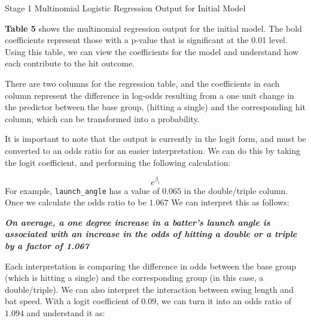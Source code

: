 \documentclass[
  letterpaper,
  DIV=11,
  numbers=noendperiod]{scrartcl}
\begin{document}
\begin{table}

\caption{\label{tbl-5}Stage 1 Multinomial Logistic Regression Output for
Initial Model}


\end{table}%

\textbf{Table 5} shows the multinomial regression output for the initial
model. The bold coefficients represent those with a p-value that is
significant at the 0.01 level. Using this table, we can view the
coefficients for the model and understand how each contribute to the hit
outcome.

There are two columns for the regression table, and the coefficients in
each column represent the difference in log-odds resulting from a one
unit change in the predictor between the base group, (hitting a single)
and the corresponding hit column, which can be transformed into a
probability.

It is important to note that the output is currently in the logit form,
and must be converted to an odds ratio for an easier interpretation. We
can do this by taking the logit coefficient, and performing the
following calculation:

\[e^{\beta_i}\] For example, \texttt{launch\_angle} has a value of
\(0.065\) in the double/triple column. Once we calculate the odds ratio
to be \(1.067\) We can interpret this as follows:

\textbf{\emph{On average, a one degree increase in a batter's launch
angle is associated with an increase in the odds of hitting a double or
a triple by a factor of 1.067}}

Each interpretation is comparing the difference in odds between the base
group (which is hitting a single) and the corresponding group (in this
case, a double/triple). We can also interpret the interaction between
swing length and bat speed. With a logit coefficient of \(0.09\), we can
turn it into an odds ratio of \(1.094\) and understand it as:
\end{document}
